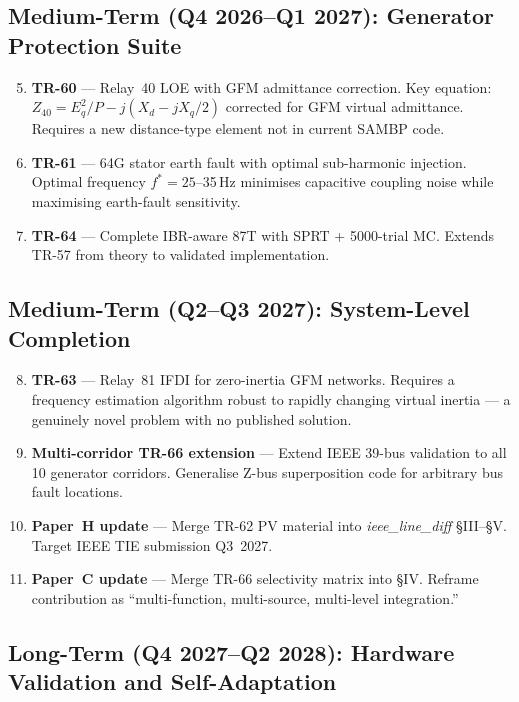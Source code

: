 \documentclass[12pt,a4paper]{article}
\begin{document}
\subsection{Medium-Term (Q4 2026--Q1 2027): Generator Protection Suite}

\begin{enumerate}
  \setcounter{enumi}{4}
  \item \textbf{TR-60} — Relay~40 LOE with GFM admittance correction.
    Key equation: $Z_{40} = E_q^2/P - j(X_d - jX_q/2)$ corrected for GFM
    virtual admittance.  Requires a new distance-type element not in current SAMBP code.
  \item \textbf{TR-61} — 64G stator earth fault with optimal sub-harmonic injection.
    Optimal frequency $f^* = 25$--35\,Hz minimises capacitive coupling noise
    while maximising earth-fault sensitivity.
  \item \textbf{TR-64} — Complete IBR-aware 87T with SPRT + 5000-trial MC.
    Extends TR-57 from theory to validated implementation.
\end{enumerate}

\subsection{Medium-Term (Q2--Q3 2027): System-Level Completion}

\begin{enumerate}
  \setcounter{enumi}{7}
  \item \textbf{TR-63} — Relay~81 IFDI for zero-inertia GFM networks.
    Requires a frequency estimation algorithm robust to rapidly changing virtual
    inertia — a genuinely novel problem with no published solution.
  \item \textbf{Multi-corridor TR-66 extension} — Extend IEEE 39-bus validation to
    all 10 generator corridors.  Generalise Z-bus superposition code for arbitrary
    bus fault locations.
  \item \textbf{Paper~H update} — Merge TR-62 PV material into \textit{ieee\_line\_diff}
    §III--§V.  Target IEEE TIE submission Q3~2027.
  \item \textbf{Paper~C update} — Merge TR-66 selectivity matrix into §IV.
    Reframe contribution as ``multi-function, multi-source, multi-level integration.''
\end{enumerate}

\subsection{Long-Term (Q4 2027--Q2 2028): Hardware Validation and Self-Adaptation}
\end{document}
